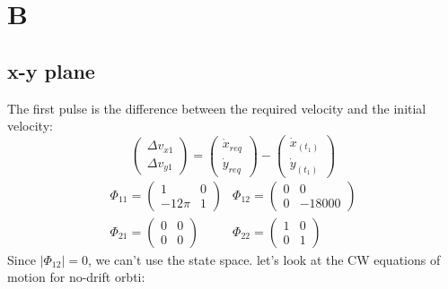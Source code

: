\documentclass[11pt, a4paper]{article}
\begin{document}
\section{B}
\subsection{x-y plane}
The first pulse is the difference between the required velocity and the initial velocity:
\begin{equation}
    \begin{pmatrix}
        \Delta v_{x1} \\ \Delta v_{y1}
    \end{pmatrix} = \begin{pmatrix}
        \dot{x}_{req} \\ \dot{y}_{req}
    \end{pmatrix} - \begin{pmatrix}
        \dot{x}_{(t_1)} \\ \dot{y}_{(t_1)}
    \end{pmatrix}
\end{equation}
\begin{equation}
    \begin{array}{ll}
        \Phi_{11} = \begin{pmatrix}
            1 & 0 \\
            -12\pi & 1
        \end{pmatrix} & \Phi_{12} = \begin{pmatrix}
            0 & 0 \\
            0 & -18000
        \end{pmatrix} \\
        \Phi_{21} = \begin{pmatrix}
            0 & 0 \\
            0 & 0
        \end{pmatrix} &
        \Phi_{22} = \begin{pmatrix}
            1 & 0 \\
            0 & 1
        \end{pmatrix}
    \end{array}
\end{equation}
Since $\left|\Phi_{12}\right| = 0$, we can't use the state space. let's look at the CW equations of motion for no-drift orbti:
\end{document}
